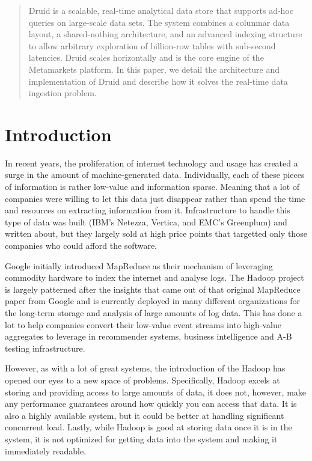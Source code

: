 \documentclass{vldb}
\begin{document}
\maketitle

\begin{abstract}
Druid is a scalable, real-time analytical data store that supports ad-hoc queries on large-scale data sets. The system combines a
columnar data layout, a shared-nothing architecture, and an advanced indexing structure to allow arbitrary exploration of billion-row
tables with sub-second latencies. Druid scales horizontally and is the core engine of the Metamarkets platform. In this paper, we detail the architecture and implementation of Druid and describe how it solves the real-time data ingestion problem.
\end{abstract}

\section{Introduction}
In recent years, the proliferation of internet technology and usage has created a surge in the amount of machine-generated data.  Individually, each of these pieces of information is rather low-value and information sparse.  Meaning that a lot of companies were willing to let this data just disappear rather than spend the time and resources on extracting information from it.  Infrastructure to handle this type of data was built (IBM's Netezza\cite{singh2011introduction}, Vertica\cite{bear2012vertica}, and EMC's Greenplum\cite{miner2012unified}) and written about\cite{barroso2009datacenter, chaudhuri1997overview, dewitt1992parallel}, but they largely sold at high price points that targetted only those companies who could afford the software.

Google initially introduced MapReduce as their mechanism of leveraging commodity hardware\cite{cite-required} to index the internet and analyse logs.  The Hadoop project is largely patterned after the insights that came out of that original MapReduce paper from Google and is currently deployed in many different organizations for the long-term storage and analysis of large amounts of log data.  This has done a lot to help companies convert their low-value event streams into high-value aggregates to leverage in recommender systems, business intelligence and A-B testing infrastructure.

However, as with a lot of great systems, the introduction of the Hadoop has opened our eyes to a new space of problems.  Specifically, Hadoop excels at storing and providing access to large amounts of data, it does not, however, make any performance guarantees around how quickly you can access that data.  It is also a highly available system, but it could be better at handling significant concurrent load.  Lastly, while Hadoop is good at storing data once it is in the system, it is not optimized for getting data into the system and making it immediately readable.
\end{document}
